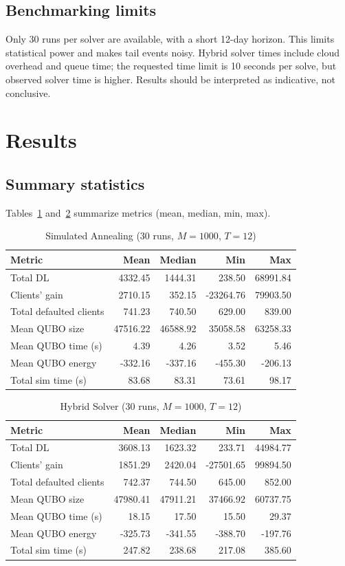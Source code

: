 \documentclass[11pt]{article}
\begin{document}
\subsection{Benchmarking limits}
Only 30 runs per solver are available, with a short 12-day horizon. This limits
statistical power and makes tail events noisy. Hybrid solver times include cloud
overhead and queue time; the requested time limit is 10 seconds per solve, but
observed solver time is higher. Results should be interpreted as indicative, not
conclusive.

\section{Results}
\subsection{Summary statistics}
Tables~\ref{tab:sa} and~\ref{tab:hybrid} summarize metrics (mean, median, min, max).

\begin{table}[h]
\centering
\caption{Simulated Annealing (30 runs, $M=1000$, $T=12$)}
\label{tab:sa}
\begin{tabular}{lrrrr}
\toprule
Metric & Mean & Median & Min & Max \\
\midrule
Total DL & 4332.45 & 1444.31 & 238.50 & 68991.84 \\
Clients' gain & 2710.15 & 352.15 & -23264.76 & 79903.50 \\
Total defaulted clients & 741.23 & 740.50 & 629.00 & 839.00 \\
Mean QUBO size & 47516.22 & 46588.92 & 35058.58 & 63258.33 \\
Mean QUBO time (s) & 4.39 & 4.26 & 3.52 & 5.46 \\
Mean QUBO energy & -332.16 & -337.16 & -455.30 & -206.13 \\
Total sim time (s) & 83.68 & 83.31 & 73.61 & 98.17 \\
\bottomrule
\end{tabular}
\end{table}

\begin{table}[h]
\centering
\caption{Hybrid Solver (30 runs, $M=1000$, $T=12$)}
\label{tab:hybrid}
\begin{tabular}{lrrrr}
\toprule
Metric & Mean & Median & Min & Max \\
\midrule
Total DL & 3608.13 & 1623.32 & 233.71 & 44984.77 \\
Clients' gain & 1851.29 & 2420.04 & -27501.65 & 99894.50 \\
Total defaulted clients & 742.37 & 744.50 & 645.00 & 852.00 \\
Mean QUBO size & 47980.41 & 47911.21 & 37466.92 & 60737.75 \\
Mean QUBO time (s) & 18.15 & 17.50 & 15.50 & 29.37 \\
Mean QUBO energy & -325.73 & -341.55 & -388.70 & -197.76 \\
Total sim time (s) & 247.82 & 238.68 & 217.08 & 385.60 \\
\bottomrule
\end{tabular}
\end{table}
\end{document}
